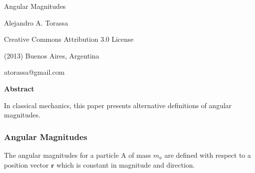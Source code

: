 \documentclass[10pt]{article}
\newcommand{\mM}{m}
\newcommand{\ra}{_a}
\newcommand{\vR}{\mathbf{r}}
\begin{document}
\begin{center}

{\LARGE Angular Magnitudes}

\bigskip \medskip

Alejandro A. Torassa

\bigskip \medskip

\footnotesize

Creative Commons Attribution 3.0 License

(2013) Buenos Aires, Argentina

atorassa@gmail.com

\bigskip \smallskip

\small

{\bf Abstract}

\bigskip

\parbox{81mm}{In classical mechanics, this paper presents alternative definitions of angular magnitudes.}

\end{center}

\normalsize

\vspace{-0.60em}

{\centering\subsubsection*{Angular Magnitudes}}

\vspace{+0.60em}

\par The angular magnitudes for a particle A of mass $\mM\ra$ are defined with respect to a position vector $\vR$ which is constant in magnitude and direction.

\vspace{+1.20em}
\end{document}

